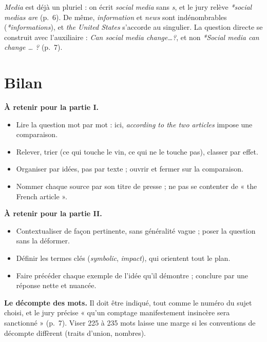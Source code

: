\documentclass[11pt,a4paper]{article}
\providecommand{\tightlist}{\setlength{\itemsep}{0pt}\setlength{\parskip}{0pt}}
\begin{document}
\begin{piege}

\emph{Media} est déjà un pluriel : on écrit \emph{social media} sans \emph{s}, et le jury relève \emph{*social medias are} (p.~6). De même, \emph{information} et \emph{news} sont indénombrables (\emph{*informations}), et \emph{the United States} s'accorde au singulier. La question directe se construit avec l'auxiliaire : \emph{Can social media change\ldots?}, et non \emph{*Social media can change \ldots{} ?} (p.~7).

\end{piege}

\hypertarget{bilan}{%
\section{Bilan}\label{bilan}}

\textbf{À retenir pour la partie I.}

\begin{itemize}
\tightlist
\item
  Lire la question mot par mot : ici, \emph{according to the two articles} impose une comparaison.
\item
  Relever, trier (ce qui touche le vin, ce qui ne le touche pas), classer par effet.
\item
  Organiser par idées, pas par texte ; ouvrir et fermer sur la comparaison.
\item
  Nommer chaque source par son titre de presse ; ne pas se contenter de « the French article ».
\end{itemize}

\textbf{À retenir pour la partie II.}

\begin{itemize}
\tightlist
\item
  Contextualiser de façon pertinente, sans généralité vague ; poser la question sans la déformer.
\item
  Définir les termes clés (\emph{symbolic}, \emph{impact}), qui orientent tout le plan.
\item
  Faire précéder chaque exemple de l'idée qu'il démontre ; conclure par une réponse nette et nuancée.
\end{itemize}

\textbf{Le décompte des mots.} Il doit être indiqué, tout comme le numéro du sujet choisi, et le jury précise « qu'un comptage manifestement insincère sera sanctionné » (p.~7). Viser 225 à 235 mots laisse une marge si les conventions de décompte diffèrent (traits d'union, nombres).
\end{document}

